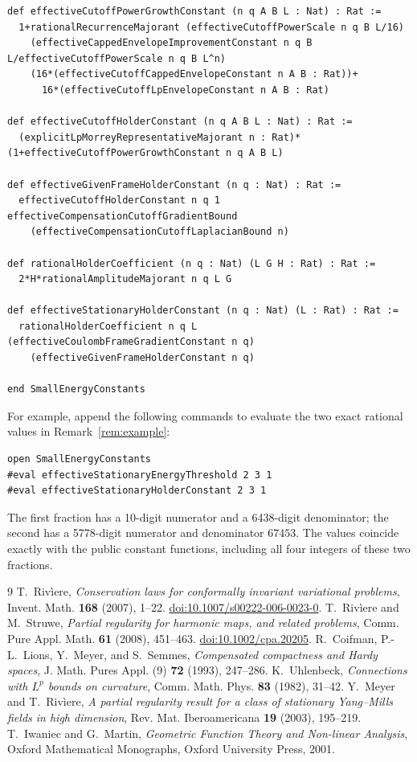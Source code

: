 \documentclass[11pt,a4paper]{article}
\numberwithin{equation}{section}
\theoremstyle{definition}
\theoremstyle{remark}
\begin{document}
\begin{lstlisting}
def effectiveCutoffPowerGrowthConstant (n q A B L : Nat) : Rat :=
  1+rationalRecurrenceMajorant (effectiveCutoffPowerScale n q B L/16)
    (effectiveCappedEnvelopeImprovementConstant n q B L/effectiveCutoffPowerScale n q B L^n)
    (16*(effectiveCutoffCappedEnvelopeConstant n A B : Rat))+
      16*(effectiveCutoffLpEnvelopeConstant n A B : Rat)

def effectiveCutoffHolderConstant (n q A B L : Nat) : Rat :=
  (explicitLpMorreyRepresentativeMajorant n : Rat)*(1+effectiveCutoffPowerGrowthConstant n q A B L)

def effectiveGivenFrameHolderConstant (n q : Nat) : Rat :=
  effectiveCutoffHolderConstant n q 1 effectiveCompensationCutoffGradientBound
    (effectiveCompensationCutoffLaplacianBound n)

def rationalHolderCoefficient (n q : Nat) (L G H : Rat) : Rat :=
  2*H*rationalAmplitudeMajorant n q L G

def effectiveStationaryHolderConstant (n q : Nat) (L : Rat) : Rat :=
  rationalHolderCoefficient n q L (effectiveCoulombFrameGradientConstant n q)
    (effectiveGivenFrameHolderConstant n q)

end SmallEnergyConstants
\end{lstlisting}
For example, append the following commands to evaluate the two exact
rational values in Remark~\ref{rem:example}:
\begin{lstlisting}
open SmallEnergyConstants
#eval effectiveStationaryEnergyThreshold 2 3 1
#eval effectiveStationaryHolderConstant 2 3 1
\end{lstlisting}
The first fraction has a 10-digit numerator and a 6438-digit denominator;
the second has a 5778-digit numerator and denominator $67453$.
The values coincide exactly with the public constant functions, including
all four integers of these two fractions.

\begin{thebibliography}{9}
 T.~Riv\`iere,
\emph{Conservation laws for conformally invariant variational problems},
Invent. Math. \textbf{168} (2007), 1--22.
\href{https://doi.org/10.1007/s00222-006-0023-0}{doi:10.1007/s00222-006-0023-0}.
 T.~Riv\`iere and M.~Struwe,
\emph{Partial regularity for harmonic maps, and related problems},
Comm. Pure Appl. Math. \textbf{61} (2008), 451--463.
\href{https://doi.org/10.1002/cpa.20205}{doi:10.1002/cpa.20205}.
 R.~Coifman, P.-L.~Lions, Y.~Meyer, and S.~Semmes,
\emph{Compensated compactness and Hardy spaces},
J. Math. Pures Appl. (9) \textbf{72} (1993), 247--286.
 K.~Uhlenbeck,
\emph{Connections with $L^p$ bounds on curvature},
Comm. Math. Phys. \textbf{83} (1982), 31--42.
 Y.~Meyer and T.~Riv\`iere,
\emph{A partial regularity result for a class of stationary Yang--Mills
fields in high dimension}, Rev. Mat. Iberoamericana \textbf{19} (2003),
195--219.
 T.~Iwaniec and G.~Martin,
\emph{Geometric Function Theory and Non-linear Analysis},
Oxford Mathematical Monographs, Oxford University Press, 2001.
\end{thebibliography}
\end{document}
